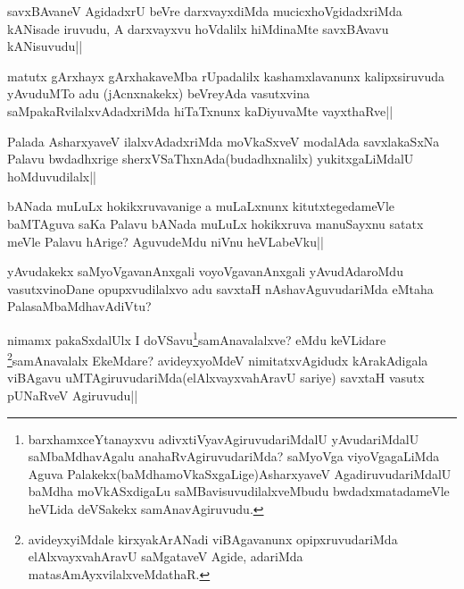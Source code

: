 \begin{artha}
savxBAvaneV AgidadxrU beVre darxvayxdiMda mucicxhoVgidadxriMda kANisade iruvudu, A darxvayxvu hoVdalilx hiMdinaMte savxBAvavu kANisuvudu||
\end{artha}

\begin{artha}
matutx gArxhayx gArxhakaveMba rUpadalilx kashamxlavanunx kalipxsiruvuda yAvuduMTo adu (jAcnxnakekx) beVreyAda vasutxvina saMpakaRvilalxvAdadxriMda hiTaTxnunx kaDiyuvaMte vayxthaRve||
\end{artha}

\begin{artha}
Palada AsharxyaveV ilalxvAdadxriMda moVkaSxveV modalAda savxlakaSxNa Palavu bwdadhxrige sherxVSaThxnAda(budadhxnalilx) yukitxgaLiMdalU hoMduvudilalx||
\end{artha}

\begin{artha}
bANada muLuLx hokikxruvavanige a muLaLxnunx kitutxtegedameVle baMTAguva saKa Palavu bANada muLuLx hokikxruva manuSayxnu satatx meVle Palavu hArige? AguvudeMdu niVnu heVLabeVku||
\end{artha}

\begin{artha}
yAvudakekx saMyoVgavanAnxgali voyoVgavanAnxgali yAvudAdaroMdu vasutxvinoDane opupxvudilalxvo adu savxtaH nAshavAguvudariMda eMtaha PalasaMbaMdhavAdiVtu?
\end{artha}

\begin{artha}
nimamx pakaSxdalUlx I doVSavu\footnote{barxhamxceYtanayxvu adivxtiVyavAgiruvudariMdalU yAvudariMdalU saMbaMdhavAgalu anahaRvAgiruvudariMda? saMyoVga viyoVgagaLiMda Aguva Palakekx(baMdhamoVkaSxgaLige)AsharxyaveV AgadiruvudariMdalU baMdha moVkASxdigaLu saMBavisuvudilalxveMbudu bwdadxmatadameVle heVLida deVSakekx samAnavAgiruvudu.}samAnavalalxve? eMdu keVLidare \footnote{avideyxyiMdale kirxyakArANadi viBAgavanunx opipxruvudariMda elAlxvayxvahAravU saMgataveV Agide, adariMda matasAmAyxvilalxveMdathaR.}samAnavalalx EkeMdare? avideyxyoMdeV nimitatxvAgidudx kArakAdigala viBAgavu uMTAgiruvudariMda(elAlxvayxvahAravU sariye) savxtaH vasutx pUNaRveV Agiruvudu||
\end{artha}

